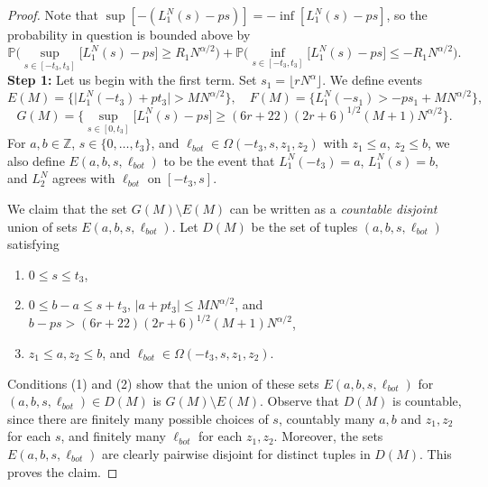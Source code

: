 \documentclass[12pt]{article}
\begin{document}
	\begin{proof}
		Note that $\sup[-(L_1^N(s)-ps)] = -\inf[L_1^N(s)-ps]$, so the probability in question is bounded above by
		\[
		\mathbb{P}\Big( \sup_{s \in [ -t_3,t_3] }\big[ L^N_1(s) - p s \big] \geq  R_1N^{\alpha/2} \Big) + \mathbb{P}\Big( \inf_{s \in [ -t_3, t_3] }\big[ L^N_1(s) - p s \big] \leq  -R_1N^{\alpha/2} \Big).
		\]
		\textbf{Step 1:} Let us begin with the first term. Set $s_1 = \lfloor rN^\alpha\rfloor$. We define events 
		\[
		E(M) = \Big\{\big|L_1^N(-t_3) + pt_3\big| > MN^{\alpha/2}\Big\}, \quad F(M) = \Big\{L_1^N(-s_1) > -ps_1 + MN^{\alpha/2} \Big\},
		\]
		\[
		G(M) = \Bigg\{\sup_{s\in[0,t_3]} \big[L_1^N(s) - ps \big] \geq (6r+22)(2r+6)^{1/2}(M+1)N^{\alpha/2} \Bigg\}.
		\]
		For $a,b\in\mathbb{Z}$, $s\in\{0,\dots,t_3\}$, and $\ell_{bot}\in\Omega(-t_3,s,z_1,z_2)$ with $z_1\leq a$, $z_2\leq b$, we also define $E(a,b,s,\ell_{bot})$ to be the event that $L_1^N(-t_3) = a$, $L_1^N(s) = b$, and $L_2^N$ agrees with $\ell_{bot}$ on $[-t_3,s]$. 
		
		We claim that the set $G(M) \setminus E(M)$ can be written as a \textit{countable disjoint} union of sets $E(a,b,s,\ell_{bot})$. Let $D(M)$ be the set of tuples $(a,b,s,\ell_{bot})$ satisfying
		\begin{enumerate}[label=(\arabic*)]
			
			\item $0\leq s\leq t_3$,
			
			\item $0\leq b-a \leq s + t_3$, $|a + pt_3| \leq MN^{\alpha/2}$, and $b-ps > (6r+22)(2r+6)^{1/2}(M+1)N^{\alpha/2}$,
			
			\item $z_1\leq a, z_2\leq b$, and $\ell_{bot}\in\Omega(-t_3, s, z_1, z_2)$.
			
		\end{enumerate}
		Conditions (1) and (2) show that the union of these sets $E(a,b,s,\ell_{bot})$ for $(a,b,s,\ell_{bot})\in D(M)$ is $G(M)\setminus E(M)$. Observe that $D(M)$ is countable, since there are finitely many possible choices of $s$, countably many $a,b$ and $z_1,z_2$ for each $s$, and finitely many $\ell_{bot}$ for each $z_1,z_2$. Moreover, the sets $E(a,b,s,\ell_{bot})$ are clearly pairwise disjoint for distinct tuples in $D(M)$. This proves the claim.
		

\end{proof}
\end{document}
